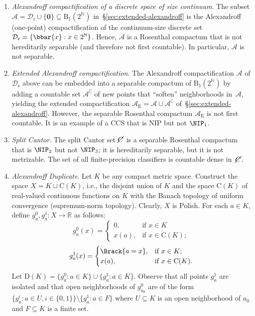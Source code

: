 \begin{example}\label{exa:Rosenthal-compacta}
\hfill
\begin{enumerate}
    \item \emph{Alexandroff compactification of a discrete space of size continuum}.
    The subset $\mathcal{A} = \mathcal{D}_{\mathfrak{c}}\cup\{\mathbf{0}\} \subseteq \mathrm{B}_1(2^{\mathbb{N}})$ in~§\ref{sec:extended-alexandroff} is the Alexandroff (one-point) compactification of the continuum-size discrete set~$\mathcal{D}_{\mathfrak{c}} = \{\bbar{x}: x\in 2^{\mathbb{N}}\}$.
    Hence, $\mathcal{A}$ is a Rosenthal compactum that is not hereditarily separable (and therefore not first countable).
    In particular, $\mathcal{A}$ is not separable.

    \item \emph{Extended Alexandroff compactification}.
    The Alexandroff compactification $\mathcal{A}$ of $\mathcal{D}_{\mathfrak{c}}$ above can be embedded into a separable compactum of $\mathrm{B}_1(2^{\mathbb{N}})$ by adding a countable set $\mathcal{A}^{\complement}$ of new points that “soften” neighborhoods in~$\mathcal{A}$, yielding the extended compactification $\mathcal{A}_{\mathrm{E}} = \mathcal{A}\cup \mathcal{A}^{\complement}$ of~§\ref{sec:extended-alexandroff}.
    However, the separable Rosenthal compactum $\mathcal{A}_{\mathrm{E}}$ is not first countable.
    It is an example of a CCS that is NIP but not $\NIP_1$.

    \item \emph{Split Cantor}.
    The split Cantor set $\cancel{C}$ is a separable Rosenthal compactum that is $\NIP_2$ but not $\NIP_3$; it is hereditarily separable, but it is not metrizable.
    The set of all finite-precision classifiers is countable dense in~$\cancel{C}$.

    \item \emph{Alexandroff Duplicate}.
    Let $K$ be any compact metric space.
    Construct the space $X = K\sqcup \mathrm{C}(K)$, i.e., the disjoint union of $K$ and the space $\mathrm{C}(K)$ of real-valued continuous functions on $K$ with the Banach topology of uniform convergence (supremum-norm topology).
    Clearly, $X$ is Polish.
    For each $a\in K$, define $g_a^0,g_a^1\colon X\to\mathbb{R}$ as follows:
    \[
    g_a^0(x)=\begin{cases}
        0, & \text{if }x\in K\\
        x(a), & \text{if }x\in \mathrm{C}(K);
    \end{cases}
    \]
    \[
	g_a^1(x)=\begin{cases}
        \Brack{a = x}, & \text{if }x\in K;\\
        x(a), & \text{if }x\in \mathrm{C}(K).
    \end{cases}
    \]
    Let $\mathrm{D}(K)=\{g_a^0:a\in K\}\cup\{g_a^1:a\in K\}$.
Observe that all points $g_a^1$ are isolated and that open neighborhoods of $g_{a_0}^0$ are of the form $\{g_a^i:a\in U,i\in\{0,1\}\}\setminus\{g_a^1:a\in F\}$ where $U\subseteq K$ is an open neighborhood of $a_0$ and $F\subseteq K$ is a finite set.


\end{enumerate}
\end{example}
